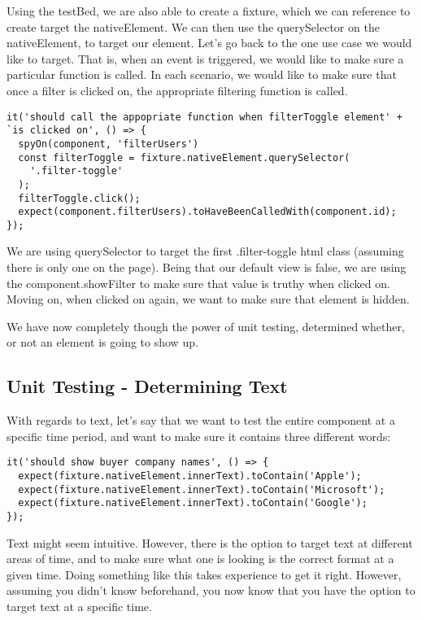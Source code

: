 Using the testBed, we are also able to create a fixture, which we can reference
to create target the nativeElement. We can then use the querySelector on the
nativeElement, to target our element. Let's go back to the one use case we
would like to target. That is, when an event is triggered, we would like to
make sure a particular function is called. In each scenario, we would like to
make sure that once a filter is clicked on, the appropriate filtering function
is called.

\begin{lstlisting}
it('should call the appopriate function when filterToggle element' +
`is clicked on', () => {
  spyOn(component, 'filterUsers')
  const filterToggle = fixture.nativeElement.querySelector(
    '.filter-toggle'
  );
  filterToggle.click();
  expect(component.filterUsers).toHaveBeenCalledWith(component.id);
});
\end{lstlisting}

We are using querySelector to target the first .filter-toggle html class
(assuming there is only one on the page). Being that our default view is false,
we are using the component.showFilter to make sure that value is truthy when
clicked on. Moving on, when clicked on again, we want to make sure that element
is hidden. 

We have now completely though the power of unit testing, determined whether, or
not an element is going to show up.

\subsection{ Unit Testing - Determining Text }
With regards to text, let's say that we want to test the entire component at a
specific time period, and want to make sure it contains three different words:
\begin{lstlisting}
it('should show buyer company names', () => {
  expect(fixture.nativeElement.innerText).toContain('Apple');
  expect(fixture.nativeElement.innerText).toContain('Microsoft');
  expect(fixture.nativeElement.innerText).toContain('Google');
});
\end{lstlisting}

Text might seem intuitive. However, there is the option to target text at
different areas of time, and to make sure what one is looking is the correct
format at a given time. Doing something like this takes experience to get it
right. However, assuming you didn't know beforehand, you now know that you have
the option to target text at a specific time.
